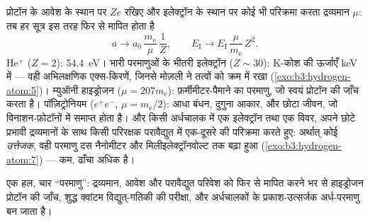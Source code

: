 \begin{example}\label{ex:b3:hydrogen-atom:scaling}
प्रोटॉन के आवेश के स्थान पर $Ze$ रखिए और इलेक्ट्रॉन के स्थान पर कोई भी
परिक्रमा करता द्रव्यमान $\mu$: तब हर सूत्र इस तरह फिर से मापित होता है
\[
a \to a_0\,\frac{m_{\text{e}}}{\mu}\,\frac1Z , \qquad
E_{\text{I}} \to E_{\text{I}}\,\frac{\mu}{m_{\text{e}}}\,Z^2 .
\]
He$^+$ ($Z = 2$): \qty{54.4}{eV}। भारी परमाणुओं के भीतरी इलेक्ट्रॉन
($Z \sim 30$): K-कोश की ऊर्जाएँ \unit{keV} में --- वही अभिलक्षणिक
एक्स-किरणें, जिनसे मोज़ली ने तत्वों को क्रम में रखा
(\cref{exo:b3:hydrogen-atom:5})। म्युऑनी हाइड्रोजन ($\mu = 207
m_{\text{e}}$): फ़र्मीमीटर-पैमाने का परमाणु, जो स्वयं प्रोटॉन की जाँच
करता है। पॉज़िट्रोनियम ($e^+e^-$, $\mu = m_{\text{e}}/2$): आधा बंधन,
दुगुना आकार, और छोटा जीवन, जो विनाशन-फ़ोटॉनों में समाप्त होता है।
और किसी अर्धचालक में एक इलेक्ट्रॉन तथा एक विवर, अपने छोटे प्रभावी
द्रव्यमानों के साथ किसी परिरक्षक परावैद्युत में एक-दूसरे की परिक्रमा
करते हुए: अर्थात् कोई \emph{उत्तेजक}, वही परमाणु दस नैनोमीटर और
मिलीइलेक्ट्रॉनवोल्ट तक बढ़ा हुआ (\cref{exo:b3:hydrogen-atom:7}) ---
 कम, ढाँचा अधिक है।
\end{example}

\begin{omfigure}

{\small एक हल, चार ``परमाणु'': द्रव्यमान, आवेश और परावैद्युत परिवेश को
फिर से मापित करने भर से हाइड्रोजन प्रोटॉन की जाँच, शुद्ध क्वांटम
विद्युत्-गतिकी की परीक्षा, और अर्धचालकों के प्रकाश-उत्सर्जक
अर्ध-परमाणु बन जाता है।}
\end{omfigure}

